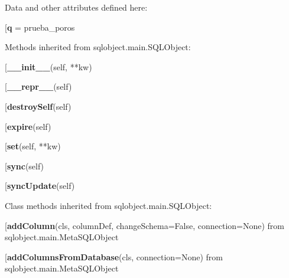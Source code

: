 Data and other attributes defined here:\\
\begin{description}\item[{\bf q} = prueba\_poros\end{description}


Methods inherited from sqlobject.main.SQLObject:\\
\begin{description}\item[{\bf \_\_init\_\_}(self, **kw)\end{description}

\begin{description}\item[{\bf \_\_repr\_\_}(self)\end{description}

\begin{description}\item[{\bf destroySelf}(self)\end{description}

\begin{description}\item[{\bf expire}(self)\end{description}

\begin{description}\item[{\bf set}(self, **kw)\end{description}

\begin{description}\item[{\bf sync}(self)\end{description}

\begin{description}\item[{\bf syncUpdate}(self)\end{description}


Class methods inherited from sqlobject.main.SQLObject:\\
\begin{description}\item[{\bf addColumn}(cls, columnDef, changeSchema=False, connection=None) from sqlobject.main.MetaSQLObject\end{description}

\begin{description}\item[{\bf addColumnsFromDatabase}(cls, connection=None) from sqlobject.main.MetaSQLObject\end{description}

